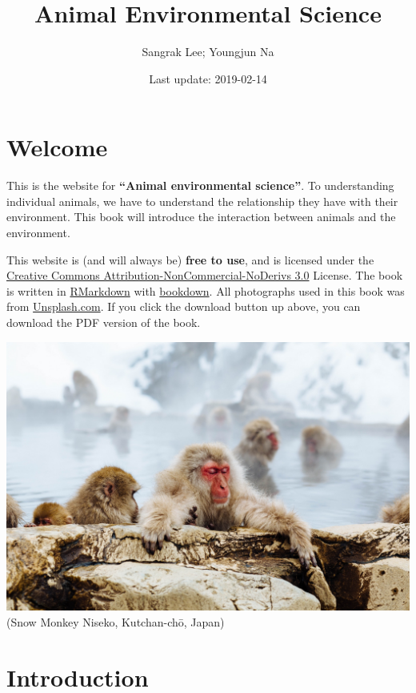 \documentclass[]{book}
\title{Animal Environmental Science}
\author{Sangrak Lee; Youngjun Na}
\date{Last update: 2019-02-14}
\begin{document}
\maketitle

{
\setcounter{tocdepth}{1}
\tableofcontents
}
\chapter*{Welcome}\label{welcome}

This is the website for \textbf{``Animal environmental science''}. To
understanding individual animals, we have to understand the relationship
they have with their environment. This book will introduce the
interaction between animals and the environment.

This website is (and will always be) \textbf{free to use}, and is
licensed under the
\href{http://creativecommons.org/licenses/by-nc-nd/3.0/us/}{Creative
Commons Attribution-NonCommercial-NoDerivs 3.0} License. The book is
written in \href{https://rmarkdown.rstudio.com}{RMarkdown} with
\href{https://bookdown.org}{bookdown}. All photographs used in this book
was from \href{https://unsplash.com/}{Unsplash.com}. If you click the
download button up above, you can download the PDF version of the book.

\includegraphics{figures/monkey.jpeg}\\
(Snow Monkey Niseko, Kutchan-chō, Japan)

\chapter{Introduction}\label{intro}
\end{document}
